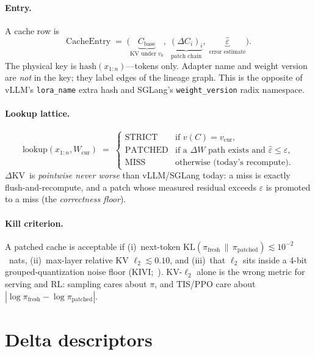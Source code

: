 \documentclass{article}
\newcommand{\dkv}{$\Delta$KV}
\begin{document}
\paragraph{Entry.}
A cache row is
\begin{equation}
  \mathrm{CacheEntry}\;=\;
  \bigl(\underbrace{C_{\mathrm{base}}}_{\text{KV under }v_0},\;
        \underbrace{(\Delta C_i)_i}_{\text{patch chain}},\;
        \underbrace{\hat\varepsilon}_{\text{error estimate}}\bigr).
\end{equation}
The physical key is $\mathrm{hash}(x_{1:n})$---tokens only.
Adapter name and weight version are \emph{not} in the key; they label
edges of the lineage graph.
This is the opposite of vLLM's \texttt{lora\_name} extra hash and
SGLang's \texttt{weight\_version} radix namespace.

\paragraph{Lookup lattice.}
\begin{equation}
  \mathrm{lookup}(x_{1:n},W_{\mathrm{cur}}) \;=\;
  \begin{cases}
    \mathrm{STRICT}  & \text{if } v(C)=v_{\mathrm{cur}},\\
    \mathrm{PATCHED} & \text{if a }\Delta W\text{ path exists and }\hat\varepsilon\le\varepsilon,\\
    \mathrm{MISS}    & \text{otherwise (today's recompute).}
  \end{cases}
\end{equation}
\dkv\ is \emph{pointwise never worse} than vLLM/SGLang today:
a miss is exactly flush-and-recompute, and a patch whose measured residual
exceeds $\varepsilon$ is promoted to a miss (the \emph{correctness floor}).

\paragraph{Kill criterion.}
A patched cache is acceptable if
(i)~next-token $\mathrm{KL}(\pi_{\mathrm{fresh}}\,\|\,\pi_{\mathrm{patched}})\lesssim 10^{-2}$~nats,
(ii)~max-layer relative KV $\ell_2\lesssim 0.10$, and
(iii)~that $\ell_2$ sits inside a 4-bit grouped-quantization noise floor
(KIVI;~\citealp{liu2024kivi}).
KV-$\ell_2$ alone is the wrong metric for serving and RL: sampling cares
about $\pi$, and TIS/PPO care about $|\log\pi_{\mathrm{fresh}}-\log\pi_{\mathrm{patched}}|$.

\section{Delta descriptors}
\label{sec:delta}
\end{document}

